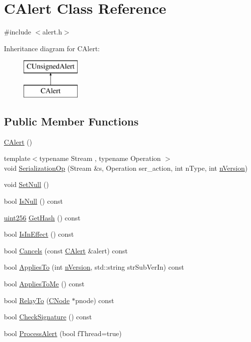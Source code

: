 \hypertarget{class_c_alert}{}\section{C\+Alert Class Reference}
\label{class_c_alert}


{\ttfamily \#include $<$alert.\+h$>$}

Inheritance diagram for C\+Alert\+:\begin{figure}[H]
\begin{center}
\leavevmode
\includegraphics[height=2.000000cm]{class_c_alert}
\end{center}
\end{figure}
\subsection*{Public Member Functions}
\begin{DoxyCompactItemize}
\item 
\hyperlink{class_c_alert_a116117e2318b9468a5ca80472c0b5157}{C\+Alert} ()
\item 
{\footnotesize template$<$typename Stream , typename Operation $>$ }\\void \hyperlink{class_c_alert_a51d73ab316bb42e65b87ec14ac536b14}{Serialization\+Op} (Stream \&s, Operation ser\+\_\+action, int n\+Type, int \hyperlink{class_c_unsigned_alert_ad8fad8e8f62caaf8162fad19170de2cf}{n\+Version})
\item 
void \hyperlink{class_c_alert_a93fd881c55ab448213787f49e316eb99}{Set\+Null} ()
\item 
bool \hyperlink{class_c_alert_ae7e110993e592a1a4f99379ab4fcfa08}{Is\+Null} () const 
\item 
\hyperlink{classuint256}{uint256} \hyperlink{class_c_alert_a59a57a4b4e93bd186ef18d4f09ebd844}{Get\+Hash} () const 
\item 
bool \hyperlink{class_c_alert_a00a8ae5ba7bc54ac7943558c33021190}{Is\+In\+Effect} () const 
\item 
bool \hyperlink{class_c_alert_a90d31fb31348f81b767f16dc5465871b}{Cancels} (const \hyperlink{class_c_alert}{C\+Alert} \&alert) const 
\item 
bool \hyperlink{class_c_alert_add9f485e29a3d1ffea20e6a5a4e42f26}{Applies\+To} (int \hyperlink{class_c_unsigned_alert_ad8fad8e8f62caaf8162fad19170de2cf}{n\+Version}, std\+::string str\+Sub\+Ver\+In) const 
\item 
bool \hyperlink{class_c_alert_a0a7fab6a971781904afb3e4a0ee29e12}{Applies\+To\+Me} () const 
\item 
bool \hyperlink{class_c_alert_ae89d673f6f1285eefcc343b3c029dab5}{Relay\+To} (\hyperlink{class_c_node}{C\+Node} $\ast$pnode) const 
\item 
bool \hyperlink{class_c_alert_a40b71fc58ec056e3e539663152092030}{Check\+Signature} () const 
\item 
bool \hyperlink{class_c_alert_af3e6b2e5d3584f58c5d7be9dbd72b4cc}{Process\+Alert} (bool f\+Thread=true)
\end{DoxyCompactItemize}
